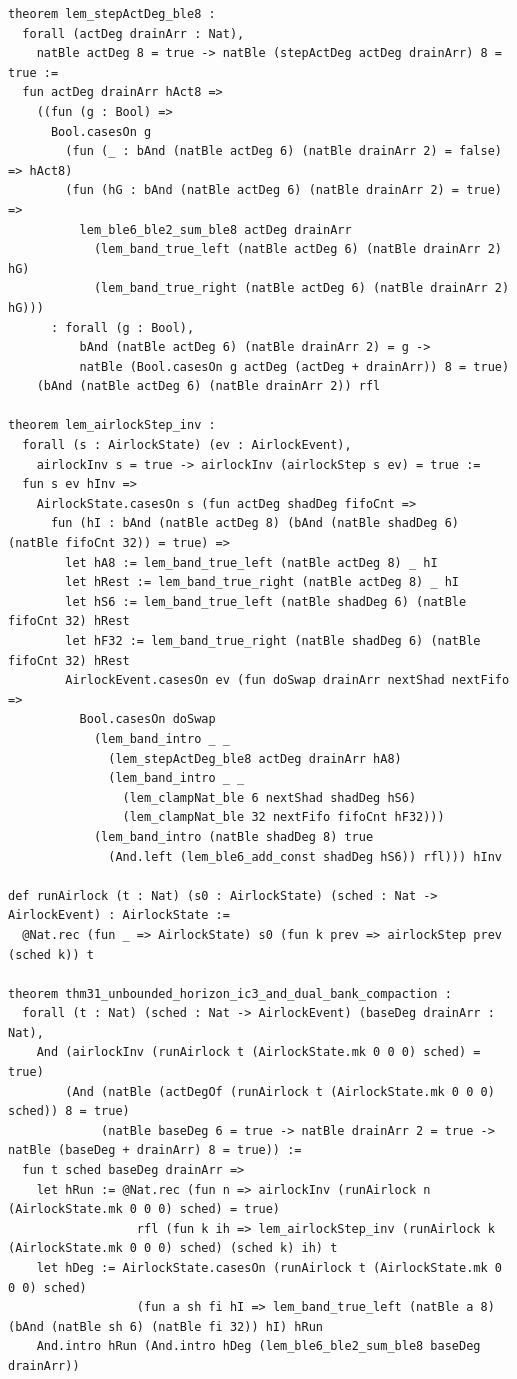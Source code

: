 \documentclass[10pt,twocolumn]{article}
\theoremstyle{spectralthm}
\begin{document}
\begin{lstlisting}[language=Lean4,caption={Standalone Pure Init.Prelude Term-Mode Lean 4 Expansion (thm30--thm37, v1.1.0, 0 sorry, 0 axioms).},label={lst:lean_v110}]
theorem lem_stepActDeg_ble8 :
  forall (actDeg drainArr : Nat),
    natBle actDeg 8 = true -> natBle (stepActDeg actDeg drainArr) 8 = true :=
  fun actDeg drainArr hAct8 =>
    ((fun (g : Bool) =>
      Bool.casesOn g
        (fun (_ : bAnd (natBle actDeg 6) (natBle drainArr 2) = false) => hAct8)
        (fun (hG : bAnd (natBle actDeg 6) (natBle drainArr 2) = true) =>
          lem_ble6_ble2_sum_ble8 actDeg drainArr
            (lem_band_true_left (natBle actDeg 6) (natBle drainArr 2) hG)
            (lem_band_true_right (natBle actDeg 6) (natBle drainArr 2) hG)))
      : forall (g : Bool),
          bAnd (natBle actDeg 6) (natBle drainArr 2) = g ->
          natBle (Bool.casesOn g actDeg (actDeg + drainArr)) 8 = true)
    (bAnd (natBle actDeg 6) (natBle drainArr 2)) rfl

theorem lem_airlockStep_inv :
  forall (s : AirlockState) (ev : AirlockEvent),
    airlockInv s = true -> airlockInv (airlockStep s ev) = true :=
  fun s ev hInv =>
    AirlockState.casesOn s (fun actDeg shadDeg fifoCnt =>
      fun (hI : bAnd (natBle actDeg 8) (bAnd (natBle shadDeg 6) (natBle fifoCnt 32)) = true) =>
        let hA8 := lem_band_true_left (natBle actDeg 8) _ hI
        let hRest := lem_band_true_right (natBle actDeg 8) _ hI
        let hS6 := lem_band_true_left (natBle shadDeg 6) (natBle fifoCnt 32) hRest
        let hF32 := lem_band_true_right (natBle shadDeg 6) (natBle fifoCnt 32) hRest
        AirlockEvent.casesOn ev (fun doSwap drainArr nextShad nextFifo =>
          Bool.casesOn doSwap
            (lem_band_intro _ _
              (lem_stepActDeg_ble8 actDeg drainArr hA8)
              (lem_band_intro _ _
                (lem_clampNat_ble 6 nextShad shadDeg hS6)
                (lem_clampNat_ble 32 nextFifo fifoCnt hF32)))
            (lem_band_intro (natBle shadDeg 8) true
              (And.left (lem_ble6_add_const shadDeg hS6)) rfl))) hInv

def runAirlock (t : Nat) (s0 : AirlockState) (sched : Nat -> AirlockEvent) : AirlockState :=
  @Nat.rec (fun _ => AirlockState) s0 (fun k prev => airlockStep prev (sched k)) t

theorem thm31_unbounded_horizon_ic3_and_dual_bank_compaction :
  forall (t : Nat) (sched : Nat -> AirlockEvent) (baseDeg drainArr : Nat),
    And (airlockInv (runAirlock t (AirlockState.mk 0 0 0) sched) = true)
        (And (natBle (actDegOf (runAirlock t (AirlockState.mk 0 0 0) sched)) 8 = true)
             (natBle baseDeg 6 = true -> natBle drainArr 2 = true -> natBle (baseDeg + drainArr) 8 = true)) :=
  fun t sched baseDeg drainArr =>
    let hRun := @Nat.rec (fun n => airlockInv (runAirlock n (AirlockState.mk 0 0 0) sched) = true)
                  rfl (fun k ih => lem_airlockStep_inv (runAirlock k (AirlockState.mk 0 0 0) sched) (sched k) ih) t
    let hDeg := AirlockState.casesOn (runAirlock t (AirlockState.mk 0 0 0) sched)
                  (fun a sh fi hI => lem_band_true_left (natBle a 8) (bAnd (natBle sh 6) (natBle fi 32)) hI) hRun
    And.intro hRun (And.intro hDeg (lem_ble6_ble2_sum_ble8 baseDeg drainArr))


\end{lstlisting}
\end{document}
